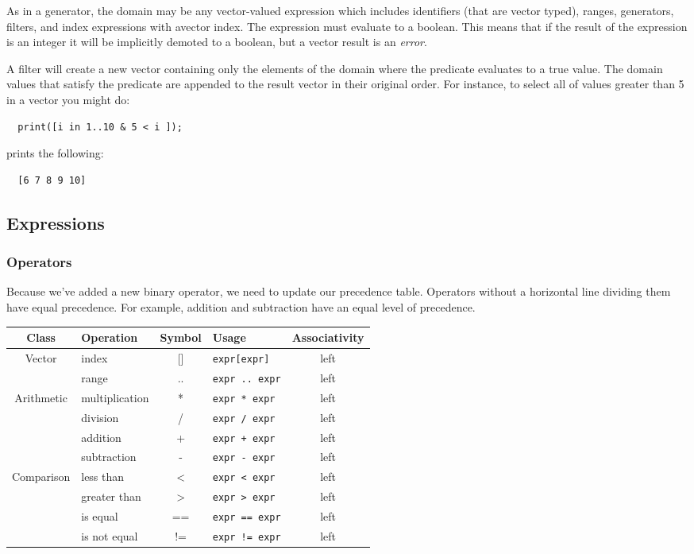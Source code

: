 \documentclass{article}
\begin{document}
As in a generator, the domain may be any vector-valued expression which includes identifiers (that
are vector typed), ranges, generators, filters, and index expressions with avector index. The
expression must evaluate to a boolean. This means that if the result of the expression is an integer
it will be implicitly demoted to a boolean, but a vector result is an \textit{error}.

A filter will create a new vector containing only the elements of the domain where the predicate
evaluates to a true value. The domain values that satisfy the predicate are appended to the result
vector in their original order. For instance, to select all of values greater than 5 in a vector
you might do:
\begin{lstlisting}
  print([i in 1..10 & 5 < i ]);
\end{lstlisting}

prints the following:
\begin{lstlisting}
  [6 7 8 9 10]
\end{lstlisting}

\subsection{Expressions}
\subsubsection{Operators}
Because we've added a new binary operator, we need to update our precedence table. Operators without
a horizontal line dividing them have equal precedence. For example, addition and subtraction have an
equal level of precedence.
\begin{center}
  \begin{tabular}{|c|l|c|l|c|}
    \hline
    \textbf{Class} & \textbf{Operation} & \textbf{Symbol} & \textbf{Usage} &
      \textbf{Associativity} \\
    \hline
    Vector
    &index          & [] & \texttt{expr[expr]} & left \\ \cline{2-5}
    &range          & .. & \texttt{expr .. expr} & left \\
    \hline
    Arithmetic
    &multiplication & * & \texttt{expr * expr} & left \\
    &division       & / & \texttt{expr / expr} & left \\ \cline{2-5}
    &addition      & + & \texttt{expr + expr} & left \\
    &subtraction    & - & \texttt{expr - expr} & left \\
    \hline
    Comparison
    &less than      & <  & \texttt{expr < expr}  & left \\
    &greater than   & >  & \texttt{expr > expr}  & left \\ \cline{2-5}
    &is equal       & == & \texttt{expr == expr} & left \\
    &is not equal   & != & \texttt{expr != expr} & left \\
    \hline
  \end{tabular}
\end{center}
\end{document}
